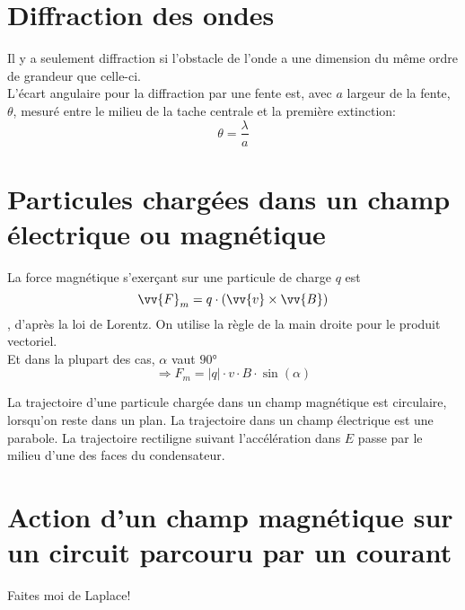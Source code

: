 \section{Diffraction des ondes}

\begin{Definition}

Il y a seulement diffraction si l'obstacle de l'onde a une dimension du même ordre de grandeur que celle-ci.\\
L'écart angulaire pour la diffraction par une fente est, avec $a$ largeur de la fente, $\theta$, mesuré entre le milieu de la tache centrale et la première extinction:
$$\theta=\dfrac{\lambda}{a}$$

\end{Definition}


\section{Particules chargées dans un champ électrique ou magnétique}

\begin{Definition}

La force magnétique s'exerçant sur une particule de charge $q$ est
$$\vv{F}_{m} = q \cdot (\vv{v}\times \vv{B})$$,
d'après la loi de Lorentz. On utilise la règle de la main droite pour le produit vectoriel. \\
Et dans la plupart des cas, $\alpha$ vaut $\ang{90}$
$$\Rightarrow F_{m} = |q| \cdot v \cdot B \cdot \sin(\alpha)$$

La trajectoire d'une particule chargée dans un champ magnétique est circulaire, lorsqu'on reste dans un plan. La trajectoire dans un champ électrique est une parabole. La trajectoire rectiligne suivant l'accélération dans $E$ passe par le milieu d'une des faces du condensateur.

\end{Definition}


\section{Action d'un champ magnétique sur un circuit parcouru par un courant}


\begin{Definition}
Faites moi de Laplace!
\end{Definition}
